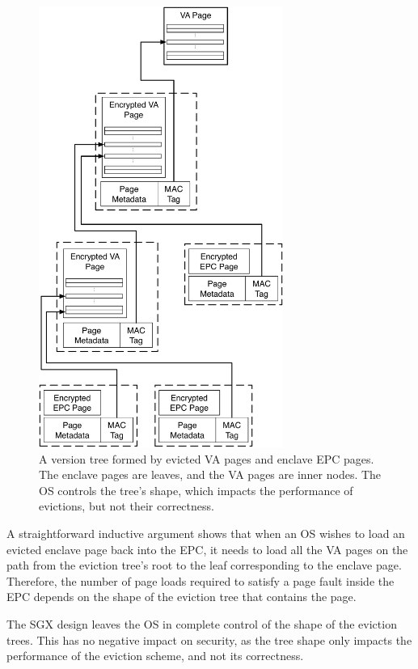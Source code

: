 \begin{figure}[hbt]
  \centering
  \includegraphics[width=80mm]{figures/sgx_eviction_tree.pdf}
  \caption{
    A version tree formed by evicted VA pages and enclave EPC pages. The
    enclave pages are leaves, and the VA pages are inner nodes. The OS controls
    the tree's shape, which impacts the performance of evictions, but not their
    correctness.
  }
  \label{fig:sgx_eviction_tree}
\end{figure}

A straightforward inductive argument shows that when an OS wishes to load an
evicted enclave page back into the EPC, it needs to load all the VA pages on
the path from the eviction tree's root to the leaf corresponding to the enclave
page. Therefore, the number of page loads required to satisfy a page fault
inside the EPC depends on the shape of the eviction tree that contains the
page.

The SGX design leaves the OS in complete control of the shape of the eviction
trees. This has no negative impact on security, as the tree shape only impacts
the performance of the eviction scheme, and not its correctness.
